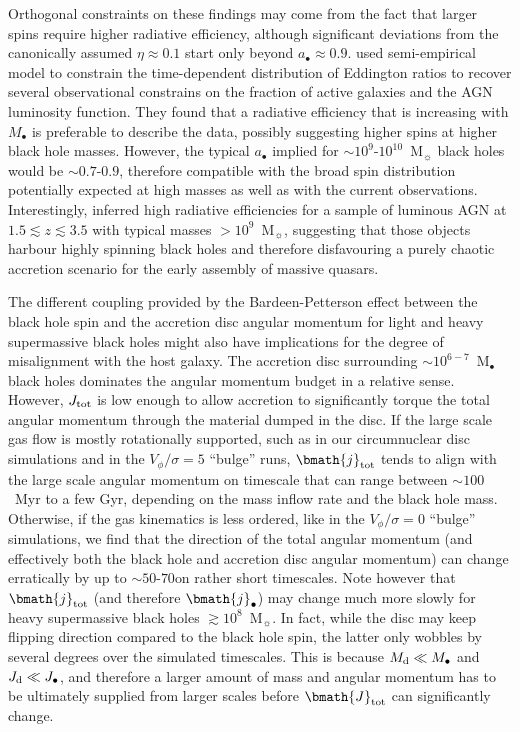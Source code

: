 \documentclass[a4paper,fleqn,usenatbib]{mnras}
\begin{document}
Orthogonal constraints on these findings may come from the fact that larger spins require higher radiative efficiency, although significant deviations from the canonically assumed $\eta \approx 0.1$ start only beyond $a_{\bullet} \approx 0.9$.
\citet{shankar+13} used semi-empirical model to constrain the time-dependent distribution of Eddington ratios to recover several observational constrains on the fraction of active galaxies and the AGN luminosity function.
They found that a radiative efficiency that is increasing with $M_{\bullet}$ is preferable to describe the data, possibly suggesting higher spins at higher black hole masses.
However, the typical $a_{\bullet}$ implied for $\sim 10^{9}$-$10^{10}$~M$_{\sun}$ black holes would be $\sim 0.7$-$0.9$, therefore compatible with the broad spin distribution potentially expected at high masses as well as with the current observations. 
Interestingly, \citet{trakhtenbrot+14} inferred high radiative  efficiencies for a sample of luminous AGN at $1.5 \lesssim z \lesssim 3.5$ with typical masses $> 10^{9}$~M$_{\sun}$, suggesting that those objects harbour highly spinning black holes and therefore disfavouring a purely chaotic accretion scenario for the early assembly of massive quasars.

The different coupling provided by the Bardeen-Petterson effect between the black hole spin and the accretion disc angular momentum for light and heavy supermassive black holes might also have implications for the degree of misalignment with the host galaxy.
The accretion disc surrounding $\sim 10^{6-7}$~M$_{\bullet}$ black holes dominates the angular momentum budget in a relative sense. 
However, $J_{\rm tot}$ is low enough to allow accretion to significantly torque the total angular momentum through the material dumped in the disc.
If the large scale gas flow is mostly rotationally supported, such as in our circumnuclear disc simulations and in the $V_{\phi}/\sigma = 5$ ``bulge'' runs, $\bmath{j}_{\rm tot}$ tends to align with the large scale angular momentum on timescale that can range between $\sim 100$~Myr to a few Gyr, depending on the mass inflow rate and the black hole mass.
Otherwise, if the gas kinematics is less ordered, like in the $V_{\phi}/\sigma = 0$ ``bulge'' simulations, we find that the direction of the total angular momentum (and effectively both the black hole and accretion disc angular momentum) can change erratically by up to $\sim 50$-$70$\degr on rather short timescales.
Note however that $\bmath{j}_{\rm tot}$ (and therefore $\bmath{j}_{\bullet}$) may change much more slowly for heavy supermassive black holes $\gtrsim 10^8$~M$_{\sun}$.
In fact, while the disc may keep flipping direction compared to the black hole spin, the latter only wobbles by several degrees over the simulated timescales.
This is because $M_{\rm d} \ll M_{\bullet}$ and $J_{\rm d} \ll J_{\bullet}$, and therefore a larger amount of mass and angular momentum has to be ultimately supplied from larger scales before $\bmath{J}_{\rm tot}$ can significantly change.
\end{document}

